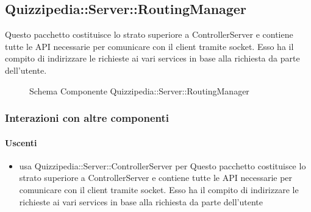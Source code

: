 \subsection{Quizzipedia::Server::RoutingManager}
Questo pacchetto costituisce lo strato superiore a ControllerServer e contiene tutte le API necessarie per comunicare con il client tramite socket. Esso ha il compito di indirizzare le richieste ai vari services in base alla richiesta da parte dell'utente.
\begin{figure}[H]
\centering
\noindent{}
\caption[Schema Componente Quizzipedia::Server::RoutingManager]{Schema Componente Quizzipedia::Server::RoutingManager}
\end{figure}
\subsubsection{Interazioni con altre componenti}
\paragraph{Uscenti}
\begin{itemize}
\item usa Quizzipedia::Server::ControllerServer per Questo pacchetto costituisce lo strato superiore a ControllerServer e contiene tutte le API necessarie per comunicare con il client tramite socket. Esso ha il compito di indirizzare le richieste ai vari services in base alla richiesta da parte dell'utente
\end{itemize}
